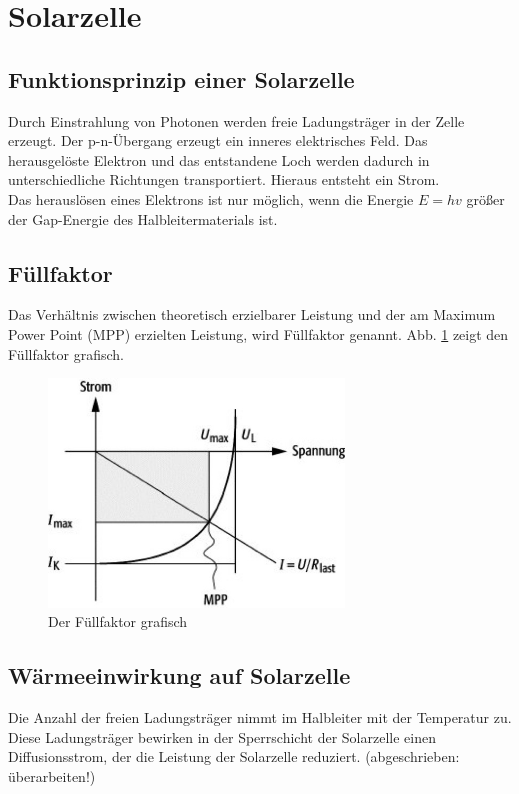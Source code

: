 \section{Solarzelle}

\subsection*{Funktionsprinzip einer Solarzelle}
Durch Einstrahlung von Photonen werden freie Ladungsträger in der Zelle erzeugt. Der p-n-Übergang erzeugt ein inneres elektrisches Feld. Das herausgelöste Elektron und das entstandene Loch werden dadurch in unterschiedliche Richtungen transportiert. Hieraus entsteht ein Strom.\\
Das herauslösen eines Elektrons ist nur möglich, wenn die Energie $E=hv$ größer der Gap-Energie des Halbleitermaterials ist.

\subsection*{Füllfaktor}
Das Verhältnis zwischen theoretisch erzielbarer Leistung und der am Maximum Power Point (MPP) erzielten Leistung, wird Füllfaktor genannt. 
Abb. \ref{fuell} zeigt den Füllfaktor grafisch.
\begin{figure}[htb]
	\centering
	\includegraphics[width=0.7\textwidth]{Abb/fuellfaktor.jpg}
	\caption{Der Füllfaktor grafisch}
	\label{fuell}
\end{figure}

\subsection*{Wärmeeinwirkung auf Solarzelle}
Die Anzahl der freien Ladungsträger nimmt im Halbleiter mit der Temperatur zu. Diese Ladungsträger bewirken in der Sperrschicht der Solarzelle einen Diffusionsstrom, der die Leistung der Solarzelle reduziert.
(abgeschrieben: überarbeiten!)

